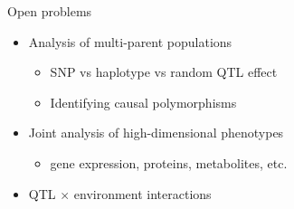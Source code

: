 \documentclass[12pt]{article}
\newcommand{\headsize}{\fontsize{35}{35} \selectfont}
\newcommand{\smallsize}{\fontsize{25}{30} \selectfont}
\newcommand{\smallersize}{\fontsize{20}{25} \selectfont}
\begin{document}
\newpage

\headsize \color{myyellow}
\hfill\begin{minipage}{5.75in}
\centering
Open problems
\end{minipage}

\vspace{1cm}

\color{mywhite} \smallsize

\hfill \begin{minipage}[t]{9.5in}
\begin{itemize}
\itemsep18pt
\setlength{\rightskip}{0pt plus 1fil} %
\item Analysis of multi-parent populations
  \begin{itemize}
    \item {\color{myblue} \smallersize SNP vs haplotype vs random QTL effect}
    \item {\color{myblue} \smallersize Identifying causal polymorphisms}
  \end{itemize}
\item Joint analysis of high-dimensional phenotypes
  \begin{itemize}
  \item {\color{myblue} \smallersize gene expression, proteins, metabolites, etc.}
  \end{itemize}
\item QTL $\times$ environment interactions
\end{itemize} \end{minipage}
\end{document}
